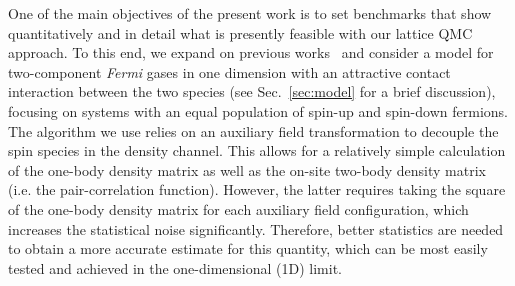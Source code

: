 \documentclass[pra,aps,groupedaddress,floatfix,twocolumn,superscriptaddress,showpacs,nofootinbib]{revtex4-1}
\begin{document}
{One of the main objectives of the present work is to set
benchmarks that show quantitatively and in detail what is presently feasible with our lattice QMC
approach. To this end, we
expand on previous works~\cite{GCS1D,Loheac:2015fxa} and consider a model for
two-component {\it Fermi} gases in one dimension with an attractive contact interaction between the two species
(see Sec.~\ref{sec:model} for a brief discussion), focusing on
systems with an equal population of
spin-up and spin-down fermions.}
The algorithm we use relies on an auxiliary field transformation to decouple
the spin species in the density channel. This allows for a relatively simple calculation of the
one-body density matrix as well as the on-site two-body density matrix (i.e. the pair-correlation
function). However, the latter
requires taking the square of the one-body density matrix for each auxiliary field configuration,
which increases the statistical noise significantly. {Therefore,
better statistics are needed to obtain a more accurate estimate for this quantity, which can be most easily tested and achieved in the one-dimensional (1D) limit.}
\end{document}

